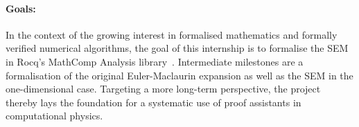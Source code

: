 \documentclass{article}
\begin{document}
\vspace{-0.2cm}
\paragraph{Goals:}
In the context of the growing interest in formalised mathematics and formally verified numerical algorithms, the goal of this internship is to formalise the SEM in Rocq's MathComp Analysis library~\cite{mahboubi2021mathematical,affeldt2023introduction}.
Intermediate milestones are a formalisation of the original Euler-Maclaurin expansion as well as the SEM in the one-dimensional case.
Targeting a more long-term perspective, the project thereby lays the foundation for a systematic use of proof assistants in computational physics.




\end{document}
